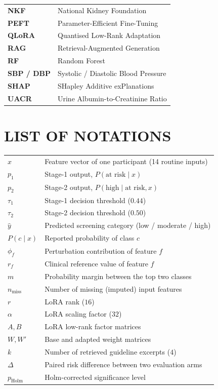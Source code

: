 \documentclass[12pt,a4paper,oneside]{report}
\newcommand{\pone}{p_{1}}
\newcommand{\ptwo}{p_{2}}
\newcommand{\tauone}{\tau_{1}}
\newcommand{\tautwo}{\tau_{2}}
\begin{document}
\begin{longtable}{@{}p{1.3in}L{4.0in}@{}}
\textbf{NKF} & National Kidney Foundation \\
\textbf{PEFT} & Parameter-Efficient Fine-Tuning \\
\textbf{QLoRA} & Quantised Low-Rank Adaptation \\
\textbf{RAG} & Retrieval-Augmented Generation \\
\textbf{RF} & Random Forest \\
\textbf{SBP / DBP} & Systolic / Diastolic Blood Pressure \\
\textbf{SHAP} & SHapley Additive exPlanations \\
\textbf{UACR} & Urine Albumin-to-Creatinine Ratio \\
\end{longtable}

\chapter*{LIST OF NOTATIONS}
\thispagestyle{fancy}

\begin{longtable}{@{}p{1.3in}L{4.0in}@{}}
$x$ & Feature vector of one participant (14 routine inputs) \\
$\pone$ & Stage-1 output, $P(\text{at risk}\mid x)$ \\
$\ptwo$ & Stage-2 output, $P(\text{high}\mid \text{at risk}, x)$ \\
$\tauone$ & Stage-1 decision threshold ($0.44$) \\
$\tautwo$ & Stage-2 decision threshold ($0.50$) \\
$\hat{y}$ & Predicted screening category (low / moderate / high) \\
$P(c\mid x)$ & Reported probability of class $c$ \\
$\phi_f$ & Perturbation contribution of feature $f$ \\
$r_f$ & Clinical reference value of feature $f$ \\
$m$ & Probability margin between the top two classes \\
$n_{\mathrm{miss}}$ & Number of missing (imputed) input features \\
$r$ & LoRA rank ($16$) \\
$\alpha$ & LoRA scaling factor ($32$) \\
$A, B$ & LoRA low-rank factor matrices \\
$W, W'$ & Base and adapted weight matrices \\
$k$ & Number of retrieved guideline excerpts ($4$) \\
$\Delta$ & Paired risk difference between two evaluation arms \\
$p_{\mathrm{Holm}}$ & Holm-corrected significance level \\
\end{longtable}
\end{document}
